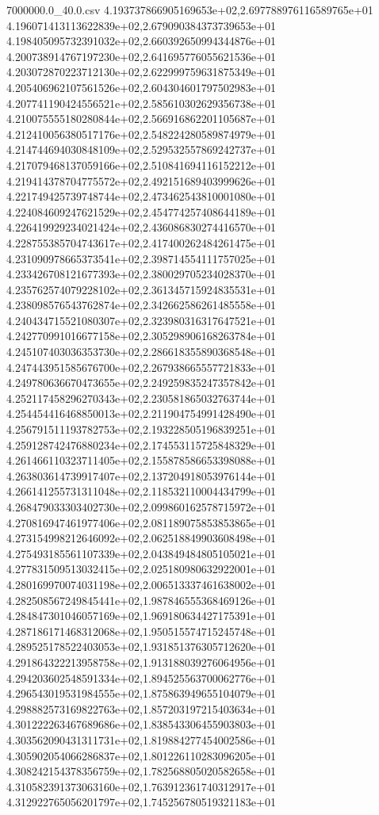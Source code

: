 \begin{filecontents*}{7000000.0_40.0.csv}
4.193737866905169653e+02,2.697788976116589765e+01
4.196071413113622839e+02,2.679090384373739653e+01
4.198405095732391032e+02,2.660392650994344876e+01
4.200738914767197230e+02,2.641695776055621536e+01
4.203072870223712130e+02,2.622999759631875349e+01
4.205406962107561526e+02,2.604304601797502983e+01
4.207741190424556521e+02,2.585610302629356738e+01
4.210075555180280844e+02,2.566916862201105687e+01
4.212410056380517176e+02,2.548224280589874979e+01
4.214744694030848109e+02,2.529532557869242737e+01
4.217079468137059166e+02,2.510841694116152212e+01
4.219414378704775572e+02,2.492151689403999626e+01
4.221749425739748744e+02,2.473462543810001080e+01
4.224084609247621529e+02,2.454774257408644189e+01
4.226419929234021424e+02,2.436086830274416570e+01
4.228755385704743617e+02,2.417400262484261475e+01
4.231090978665373541e+02,2.398714554111757025e+01
4.233426708121677393e+02,2.380029705234028370e+01
4.235762574079228102e+02,2.361345715924835531e+01
4.238098576543762874e+02,2.342662586261485558e+01
4.240434715521080307e+02,2.323980316317647521e+01
4.242770991016677158e+02,2.305298906168263784e+01
4.245107403036353730e+02,2.286618355890368548e+01
4.247443951585676700e+02,2.267938665557721833e+01
4.249780636670473655e+02,2.249259835247357842e+01
4.252117458296270343e+02,2.230581865032763744e+01
4.254454416468850013e+02,2.211904754991428490e+01
4.256791511193782753e+02,2.193228505196839251e+01
4.259128742476880234e+02,2.174553115725848329e+01
4.261466110323711405e+02,2.155878586653398088e+01
4.263803614739917407e+02,2.137204918053976144e+01
4.266141255731311048e+02,2.118532110004434799e+01
4.268479033303402730e+02,2.099860162578715972e+01
4.270816947461977406e+02,2.081189075853853865e+01
4.273154998212646092e+02,2.062518849903608498e+01
4.275493185561107339e+02,2.043849484805105021e+01
4.277831509513032415e+02,2.025180980632922001e+01
4.280169970074031198e+02,2.006513337461638002e+01
4.282508567249845441e+02,1.987846555368469126e+01
4.284847301046057169e+02,1.969180634427175391e+01
4.287186171468312068e+02,1.950515574715245748e+01
4.289525178522403053e+02,1.931851376305712620e+01
4.291864322213958758e+02,1.913188039276064956e+01
4.294203602548591334e+02,1.894525563700062776e+01
4.296543019531984555e+02,1.875863949655104079e+01
4.298882573169822763e+02,1.857203197215403634e+01
4.301222263467689686e+02,1.838543306455903803e+01
4.303562090431311731e+02,1.819884277454002586e+01
4.305902054066286837e+02,1.801226110283096205e+01
4.308242154378356759e+02,1.782568805020582658e+01
4.310582391373063160e+02,1.763912361740312917e+01
4.312922765056201797e+02,1.745256780519321183e+01

\end{filecontents*}
